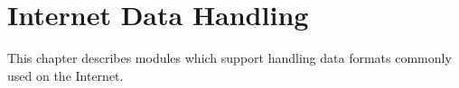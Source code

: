 \chapter{Internet Data Handling \label{netdata}}

This chapter describes modules which support handling data formats
commonly used on the Internet.

\localmoduletable
